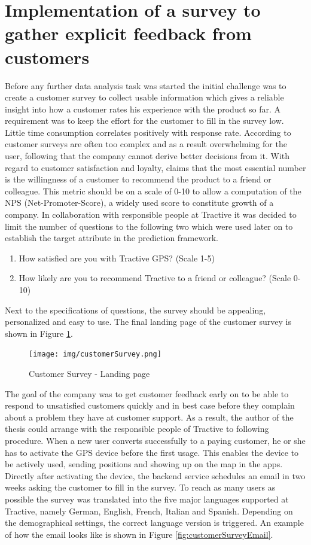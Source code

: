 \section{Implementation of a survey to gather explicit feedback from customers}
Before any further data analysis task was started the initial challenge was to create a customer survey to collect usable information which gives a reliable insight into how a customer rates his experience with the product so far. A requirement was to keep the effort for the customer to fill in the survey low. Little time consumption correlates positively with response rate. According to \cite{reichheld2003one} customer surveys are often too complex and as a result overwhelming for the user, following that the company cannot derive better decisions from it. With regard to customer satisfaction and loyalty, \cite{reichheld2003one} claims that the most essential number is the willingness of a customer to recommend the product to a friend or colleague. This metric should be on a scale of 0-10 to allow a computation of the NPS (Net-Promoter-Score), a widely used score to constitute growth of a company. In collaboration with responsible people at Tractive it was decided to limit the number of questions to the following two which were used later on to establish the target attribute in the prediction framework.

\begin{enumerate}
	\item How satisfied are you with Tractive GPS? (Scale 1-5)
	\item How likely are you to recommend Tractive to a friend or colleague? (Scale 0-10)
\end{enumerate}

Next to the specifications of questions, the survey should be appealing, personalized and easy to use. The final landing page of the customer survey is shown in Figure \ref{fig:customerSurvey}. 

\begin{figure}
	\centering
	\texttt{[image: img/customerSurvey.png]}
	\caption{Customer Survey - Landing page}
	\label{fig:customerSurvey}
\end{figure} 

The goal of the company was to get customer feedback early on to be able to respond to unsatisfied customers quickly and in best case before they complain about a problem they have at customer support. As a result, the author of the thesis could arrange with the responsible people of Tractive to following procedure. When a new user converts successfully to a paying customer, he or she has to activate the GPS device before the first usage. This enables the device to be actively used, sending positions and showing up on the map in the apps. Directly after activating the device, the backend service schedules an email in two weeks asking the customer to fill in the survey. To reach as many users as possible the survey was translated into the five major languages supported at Tractive, namely German, English, French, Italian and Spanish. Depending on the demographical settings, the correct language version is triggered. An example of how the email looks like is shown in Figure \ref{fig:customerSurveyEmail}.

